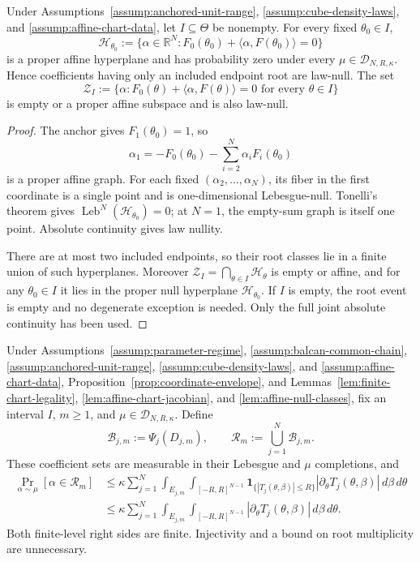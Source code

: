 \begin{lemma}
\label{lem:affine-null-classes}
Under Assumptions~\ref{assump:anchored-unit-range},
\ref{assump:cube-density-laws}, and
\ref{assump:affine-chart-data}, let $I\subseteq\Theta$ be nonempty.  For
every fixed $\theta_0\in I$,
\[
\mathcal H_{\theta_0}
:=\{\alpha\in\mathbb R^N:
F_0(\theta_0)+\langle\alpha,F(\theta_0)\rangle=0\}
\]
is a proper affine hyperplane and has probability zero under every
$\mu\in\mathcal D_{N,R,\kappa}$.  Hence coefficients having only an included
endpoint root are law-null.  The set
\[
\mathcal Z_I:=\{\alpha:F_0(\theta)+\langle\alpha,F(\theta)\rangle=0
                 \text{ for every }\theta\in I\}
\]
is empty or a proper affine subspace and is also law-null.
\end{lemma}

\begin{proof}
The anchor gives $F_1(\theta_0)=1$, so
\[
\alpha_1=-F_0(\theta_0)-\sum_{i=2}^N\alpha_iF_i(\theta_0)
\]
is a proper affine graph.  For each fixed
$(\alpha_2,\ldots,\alpha_N)$, its fiber in the first coordinate is a single
point and is one-dimensional Lebesgue-null.  Tonelli's theorem
\citep{bogachev2007measure} gives
$\operatorname{Leb}^N(\mathcal H_{\theta_0})=0$; at $N=1$, the empty-sum
graph is itself one point.  Absolute continuity gives law nullity.

There are at most two included endpoints, so their root classes lie in a
finite union of such hyperplanes.  Moreover
$\mathcal Z_I=\bigcap_{\theta\in I}\mathcal H_\theta$ is empty or affine,
and for any $\theta_0\in I$ it lies in the proper null hyperplane
$\mathcal H_{\theta_0}$.  If $I$ is empty, the root event is empty and no
degenerate exception is needed.  Only the full joint absolute continuity has
been used.
\end{proof}

\begin{proposition}
\label{prop:finite-chart-area}
Under Assumptions~\ref{assump:parameter-regime},
\ref{assump:balcan-common-chain},
\ref{assump:anchored-unit-range},
\ref{assump:cube-density-laws}, and
\ref{assump:affine-chart-data}, Proposition~\ref{prop:coordinate-envelope},
and Lemmas~\ref{lem:finite-chart-legality},
\ref{lem:affine-chart-jacobian}, and
\ref{lem:affine-null-classes}, fix an interval $I$, $m\geq1$, and
$\mu\in\mathcal D_{N,R,\kappa}$.  Define
\[
\mathcal B_{j,m}:=\Psi_j(D_{j,m}),
\qquad
\mathcal R_m:=\bigcup_{j=1}^N\mathcal B_{j,m}.
\]
These coefficient sets are measurable in their Lebesgue and $\mu$
completions, and
\[
\begin{aligned}
\Pr_{\alpha\sim\mu}[\alpha\in\mathcal R_m]
&\leq\kappa\sum_{j=1}^N
\int_{E_{j,m}}\int_{[-R,R]^{N-1}}
\mathbf1_{\{|T_j(\theta,\beta)|\leq R\}}
|\partial_\theta T_j(\theta,\beta)|
\,d\beta\,d\theta\\
&\leq\kappa\sum_{j=1}^N
\int_{E_{j,m}}\int_{[-R,R]^{N-1}}
|\partial_\theta T_j(\theta,\beta)|
\,d\beta\,d\theta.
\end{aligned}
\tag{A.34}
\]
Both finite-level right sides are finite.  Injectivity and a bound on root
multiplicity are unnecessary.
\end{proposition}

